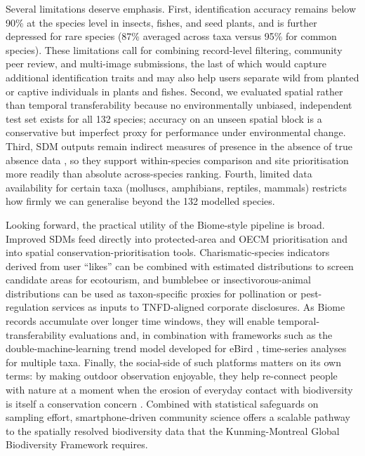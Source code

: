 \documentclass[11pt]{article}
\begin{document}
Several limitations deserve emphasis. First, identification accuracy remains below 90\% at the species level in insects, fishes, and seed plants, and is further depressed for rare species (87\% averaged across taxa versus 95\% for common species). These limitations call for combining record-level filtering, community peer review, and multi-image submissions, the last of which would capture additional identification traits and may also help users separate wild from planted or captive individuals in plants and fishes. Second, we evaluated spatial rather than temporal transferability because no environmentally unbiased, independent test set exists for all 132 species; accuracy on an unseen spatial block is a conservative but imperfect proxy for performance under environmental change. Third, SDM outputs remain indirect measures of presence in the absence of true absence data \citep{elith2011statistical}, so they support within-species comparison and site prioritisation more readily than absolute across-species ranking. Fourth, limited data availability for certain taxa (molluscs, amphibians, reptiles, mammals) restricts how firmly we can generalise beyond the 132 modelled species.

Looking forward, the practical utility of the Biome-style pipeline is broad. Improved SDMs feed directly into protected-area and OECM prioritisation and into spatial conservation-prioritisation tools. Charismatic-species indicators derived from user ``likes'' can be combined with estimated distributions to screen candidate areas for ecotourism, and bumblebee or insectivorous-animal distributions can be used as taxon-specific proxies for pollination or pest-regulation services as inputs to TNFD-aligned corporate disclosures. As Biome records accumulate over longer time windows, they will enable temporal-transferability evaluations and, in combination with frameworks such as the double-machine-learning trend model developed for eBird \citep{fink2023double}, time-series analyses for multiple taxa. Finally, the social-side of such platforms matters on its own terms: by making outdoor observation enjoyable, they help re-connect people with nature at a moment when the erosion of everyday contact with biodiversity is itself a conservation concern \citep{soga2023biophobia,porfirio2014improving}. Combined with statistical safeguards on sampling effort, smartphone-driven community science offers a scalable pathway to the spatially resolved biodiversity data that the Kunming-Montreal Global Biodiversity Framework requires.



\end{document}
